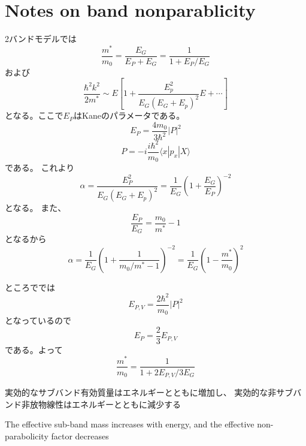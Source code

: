 \documentclass[11pt,uplatex,a4paper]{jsarticle}
\begin{document}
\appendix
\section{Notes on band nonparablicity}
2バンドモデルでは\cite{mikoshiba}
\begin{equation}
 \frac{m^*}{m_0} = \frac{E_G}{E_P+E_G} = \frac{1}{1+E_P/E_G}
\end{equation}
および
\begin{equation}
 \frac{\hbar^2k^2}{2m^*} \sim
  E \left[ 1 + \frac{E_p^2}{E_G(E_G+E_p)^2}E + \cdots
	\right]
\end{equation}
となる。ここで$E_P$はKaneのパラメータである。
\begin{equation}
 E_P = \frac{4 m_0}{3 \hbar^2}|P|^2
\end{equation}
\begin{equation}
 P=-i\frac{i\hbar^2}{m_0}\langle x | p_x| X\rangle
\end{equation}
である。
これより
\begin{equation}
 \alpha = \frac{E_P^2}{E_G(E_G+E_p)^2} = \frac{1}{E_G}(1+\frac{E_G}{E_P})^{-2}
\end{equation}
となる。
また、
\begin{equation}
 \frac{E_P}{E_G} = \frac{m_0}{m^*}-1
\end{equation}
となるから
\begin{equation}
 \alpha = \frac{1}{E_G} (1+\frac{1}{m_0/m^*-1})^{-2}
  = \frac{1}{E_G} (1-\frac{m^*}{m_0})^2
\end{equation}

ところで\cite{Vurgaftman}では
\begin{equation}
 E_{P,V}=\frac{2\hbar^2}{m_0}|P|^2
\end{equation}
となっているので
\begin{equation}
 E_P =\frac{2}{3}E_{P,V}
\end{equation}
である。よって
\begin{equation}
 \frac{m^*}{m_0} =  \frac{1}{1+2E_{P,V}/3E_G}
\end{equation}

実効的なサブバンド有効質量はエネルギーとともに増加し、
実効的な非サブバンド非放物線性はエネルギーとともに減少する

The effective sub-band mass increases with energy, and the effective non-parabolicity factor decreases
\end{document}
